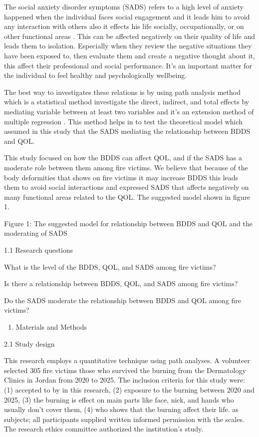 \documentclass[10pt]{NSP1}
\begin{document}
The social anxiety disorder symptoms (SADS) refers to a high level of anxiety happened when the individual faces social engagement and it leads him to avoid any interaction with others also it effects his life socially, occupationally, or on other functional areas . This can be affected negatively on their quality of life and leads them to isolation. Especially when they review the negative situations they have been exposed to, then evaluate them and create a negative thought about it, this affect their professional and social performance. It’s an important matter for the individual to feel healthy and psychologically wellbeing.

The best way to investigates these relations is by using path analysis method which is a statistical method investigate the direct, indirect, and total effects by mediating variable between at least two variables and it’s an extension method of multiple regression . This method helps in to test the theoretical model which assumed in this study that the SADS mediating the relationship between BDDS and QOL.

This study focused on how the BDDS can affect QOL, and if the SADS has a moderate role between them among fire victims. We believe that because of the body deformities that shows on fire victims it may increase BDDS this leads them to avoid social interactions and expressed SADS that affects negatively on many functional areas related to the QOL. The suggested model shown in figure 1.

Figure 1: The suggested model for relationship between BDDS and QOL and the moderating of SADS

1.1 Research questions

What is the level of the BDDS, QOL, and SADS among fire victims?

Is there a relationship between BDDS, QOL, and SADS among fire victims?

Do the SADS moderate the relationship between BDDS and QOL among fire victims?

\begin{enumerate}
  \item Materials and Methods
\end{enumerate}

2.1 Study design

This research employs a quantitative technique using path analyses. A volunteer selected 305 fire victims those who survived the burning from the Dermatology Clinics in Jordan from 2020 to 2025. The inclusion criteria for this study were: (1) accepted to by in this research, (2) exposure to the burning between 2020 and 2025, (3) the burning is effect on main parts like face, nick, and hands who usually don’t cover them, (4) who shows that the burning affect their life. as subjects; all participants supplied written informed permission with the scales. The research ethics committee authorized the institution’s study.
\end{document}
